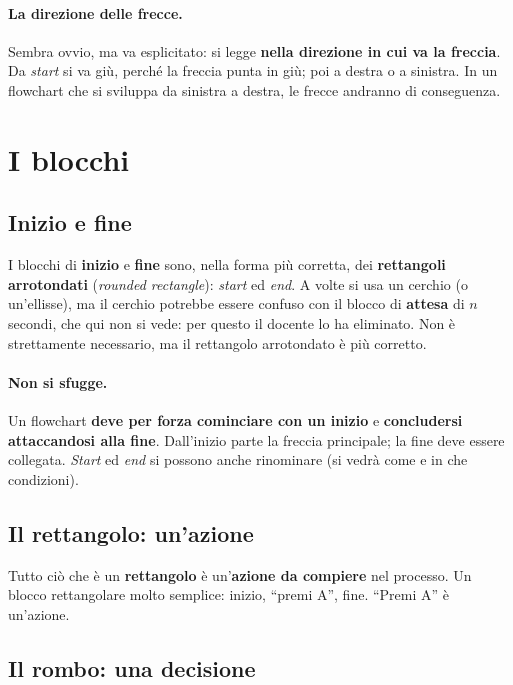 \paragraph{La direzione delle frecce.} Sembra ovvio, ma va esplicitato: si
legge \textbf{nella direzione in cui va la freccia}. Da \emph{start} si va
giù, perché la freccia punta in giù; poi a destra o a sinistra. In un
flowchart che si sviluppa da sinistra a destra, le frecce andranno di
conseguenza.

\section{I blocchi}
\label{sec:flowchart-blocchi}

\subsection{Inizio e fine}

I blocchi di \textbf{inizio} e \textbf{fine} sono, nella forma più corretta,
dei \textbf{rettangoli arrotondati} (\emph{rounded rectangle}): \emph{start}
ed \emph{end}. A volte si usa un cerchio (o un'ellisse), ma il cerchio
potrebbe essere confuso con il blocco di \textbf{attesa} di $n$ secondi, che
qui non si vede: per questo il docente lo ha eliminato. Non è strettamente
necessario, ma il rettangolo arrotondato è più corretto.

\paragraph{Non si sfugge.} Un flowchart \textbf{deve per forza cominciare con
un inizio} e \textbf{concludersi attaccandosi alla fine}. Dall'inizio parte
la freccia principale; la fine deve essere collegata. \emph{Start} ed
\emph{end} si possono anche rinominare (si vedrà come e in che condizioni).

\subsection{Il rettangolo: un'azione}

Tutto ciò che è un \textbf{rettangolo} è un'\textbf{azione da compiere} nel
processo. Un blocco rettangolare molto semplice: inizio, ``premi A'', fine.
``Premi A'' è un'azione.

\subsection{Il rombo: una decisione}

